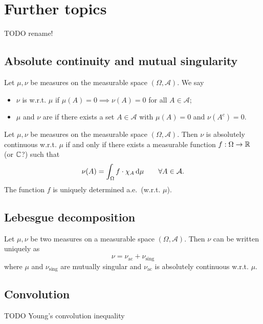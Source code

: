 \section{Further topics}
TODO rename!

\subsection{Absolute continuity and mutual singularity}
\begin{definition}
Let $\mu,\nu$ be measures on the measurable space $(\Omega,\mathcal{A})$. We say
\begin{itemize}
\item $\nu$ is  w.r.t. $\mu$ if $\mu(A)=0\implies \nu(A) = 0$ for all $A\in\mathcal{A}$;
\item $\mu$ and $\nu$ are  if there exists a set $A\in\mathcal{A}$ with $\mu(A) = 0$ and $\nu(A^c) = 0$.
\end{itemize}
\end{definition}

\begin{theorem}
Let $\mu,\nu$ be measures on the measurable space $(\Omega,\mathcal{A})$. Then $\nu$ is absolutely continuous w.r.t. $\mu$ \textup{if and only if} there exists a measurable function $f:\Omega\to\mathbb{R}$ (or $\mathbb{C}$?) such that
\[ \nu(A) = \int_\Omega f\cdot \chi_A \operatorname{d \!}{\mu} \qquad \forall A\in\mathcal{A}. \]
The function $f$ is uniquely determined a.e.\ (w.r.t. $\mu$).
\end{theorem}

\subsection{Lebesgue decomposition}
\begin{theorem}
Let $\mu, \nu$ be two measures on a measurable space $(\Omega, \mathcal{A})$. Then $\nu$ can be written uniquely as
\[ \nu = \nu_\text{ac} + \nu_\text{sing} \]
where $\mu$ and $\nu_\text{sing}$ are mutually singular and $\nu_\text{ac}$ is absolutely continuous w.r.t. $\mu$. 

\end{theorem}

\subsection{Convolution}
TODO Young's convolution inequality

